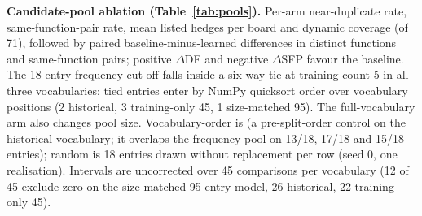 \textbf{Candidate-pool ablation (Table~\ref{tab:pools}).} Per-arm near-duplicate rate, same-function-pair rate, mean listed hedges per board and dynamic coverage (of 71), followed by paired baseline-minus-learned differences in distinct functions and same-function pairs; positive $\Delta$DF and negative $\Delta$SFP favour the baseline. The 18-entry frequency cut-off falls inside a six-way tie at training count 5 in all three vocabularies; tied entries enter by NumPy quicksort order over vocabulary positions (2 historical, 3 training-only 45, 1 size-matched 95). The full-vocabulary arm also changes pool size. Vocabulary-order is  (a pre-split-order control on the historical vocabulary; it overlaps the frequency pool on 13/18, 17/18 and 15/18 entries); random is 18 entries drawn without replacement per row (seed 0, one realisation). Intervals are uncorrected over 45 comparisons per vocabulary (12 of 45 exclude zero on the size-matched 95-entry model, 26 historical, 22 training-only 45). %
